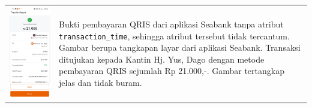 \begin{table}[h!]
\begin{tabularx}{\textwidth}{m{} X}
        \includegraphics[width=\linewidth]{images/contoh-data/qris-4.jpg}
        & 
        Bukti pembayaran QRIS dari aplikasi Seabank tanpa atribut \texttt{transaction\_time}, sehingga atribut tersebut tidak tercantum. Gambar berupa tangkapan layar dari aplikasi Seabank. Transaksi ditujukan kepada Kantin Hj. Yus, Dago dengan metode pembayaran QRIS sejumlah Rp 21.000,-. Gambar tertangkap jelas dan tidak buram. \\
    \end{tabularx}
\end{table}

